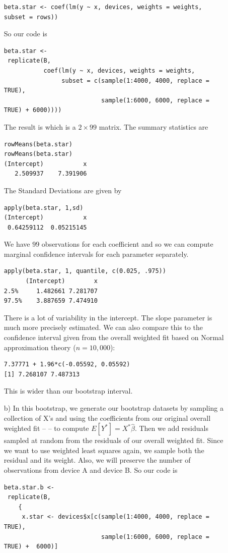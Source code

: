 \documentclass{article}
\begin{document}
\begin{description}
\begin{enumerate}
\begin{verbatim}
beta.star <- coef(lm(y ~ x, devices, weights = weights, subset = rows))
\end{verbatim}

So our code is
\begin{verbatim}
beta.star <-
 replicate(B, 
           coef(lm(y ~ x, devices, weights = weights, 
                subset = c(sample(1:4000, 4000, replace = TRUE),
                           sample(1:6000, 6000, replace = TRUE) + 6000))))
\end{verbatim}

The result is  which is a $2 \times  99$ matrix.
The summary statistics are
\begin{verbatim}
rowMeans(beta.star)
rowMeans(beta.star)
(Intercept)           x 
   2.509937    7.391906 
\end{verbatim}
The Standard Deviations are given by
\begin{verbatim}
apply(beta.star, 1,sd)
(Intercept)           x 
 0.64259112  0.05215145 
\end{verbatim}

We have $99$ observations for each coefficient
and so we can compute marginal confidence intervals
for each parameter separately.
\begin{verbatim}
apply(beta.star, 1, quantile, c(0.025, .975))
      (Intercept)        x
2.5%     1.482661 7.281707
97.5%    3.887659 7.474910
\end{verbatim}
There is a lot of variability in the intercept. The
slope parameter is much more precisely estimated.
We can also compare this to the confidence interval
given from the overall weighted fit based on Normal
approximation theory ($n = 10,000$):
\begin{verbatim}
7.37771 + 1.96*c(-0.05592, 0.05592)
[1] 7.268107 7.487313
\end{verbatim}
This is wider than our bootstrap interval.


\item[b)] In this bootstrap, we generate our bootstrap datasets by
  sampling a collection of X's and using the coefficients from our
  original overall weighted fit --  -- to compute
  $E[Y^*] = X^*\hat\beta$. Then we add residuals sampled at random
  from the residuals of our overall weighted fit.
  Since we want to use weighted least squares again, we sample both
  the residual and its weight.  Also, we will preserve the number of 
  observations from device A and device B.
So our code is
\begin{verbatim}
beta.star.b <-
 replicate(B,
    {
     x.star <- devices$x[c(sample(1:4000, 4000, replace = TRUE),
                           sample(1:6000, 6000, replace = TRUE) +  6000)]


\end{verbatim}
\end{enumerate}
\end{description}
\end{document}
